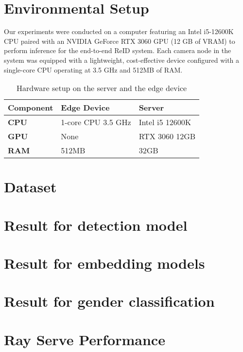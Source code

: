 \documentclass[../main.tex]{subfiles}
\begin{document}
\section{Environmental Setup}
\label{sec:environmental_setup}

Our experiments were conducted on a computer featuring an Intel i5-12600K CPU paired with an NVIDIA GeForce RTX 3060 GPU (12 GB of VRAM) to perform inference for the end-to-end ReID system. Each camera node in the system was equipped with a lightweight, cost-effective device configured with a single-core CPU operating at 3.5 GHz and 512MB of RAM.

\begin{table}[h]
\centering
\caption{Hardware setup on the server and the edge device}
\label{tab:hardware_setup}
\begin{tabular}{|p{3.5cm}|p{5cm}|p{5cm}|}
\hline
\textbf{Component} & \textbf{Edge Device} & \textbf{Server} \\
\hline
\textbf{CPU} & 1-core CPU 3.5 GHz & Intel i5 12600K \\
\hline
\textbf{GPU} & None & RTX 3060 12GB \\
\hline
\textbf{RAM} & 512MB & 32GB \\
\hline
\end{tabular}
\end{table}

\section{Dataset}
\label{sec:dataset}


\section{Result for detection model}
\label{sec:detection_experiments}


\section{Result for embedding models}
\label{sec:embedding_experiments}


\section{Result for gender classification}
\label{sec:classification_experiments}


\section{Ray Serve Performance}
\label{sec:ray_serve_performance}

\end{document}
